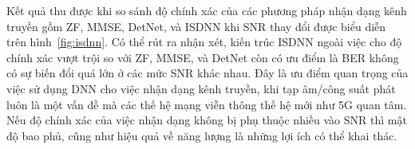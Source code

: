 Kết quả thu được khi so sánh độ chính xác của các phương pháp nhận dạng kênh truyền gồm ZF, MMSE, DetNet, và ISDNN khi SNR thay đổi được biểu diễn trên hình~\ref{fig:isdnn}. 
Có thể rút ra nhận xét, kiến trúc ISDNN ngoài việc cho độ chính xác vượt trội so với ZF, MMSE, và DetNet còn có ưu điểm là BER không có sự biến đổi quá lớn ở các mức SNR khác nhau. Đây là ưu điểm quan trọng của việc sử dụng DNN cho việc nhận dạng kênh truyền, khi tạp âm/công suất phát luôn là một vấn đề mà các thế hệ mạng viễn thông thế hệ mới như 5G quan tâm. Nếu độ chính xác của việc nhận dạng không bị phụ thuộc nhiều vào SNR thì mật độ bao phủ, cũng như hiệu quả về năng lượng là những lợi ích có thể khai thác.

